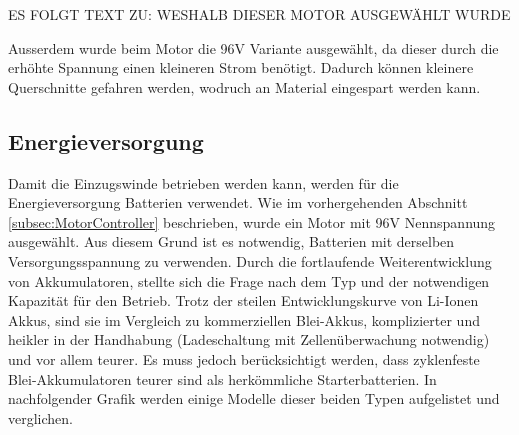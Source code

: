 ES FOLGT TEXT ZU: WESHALB DIESER MOTOR AUSGEWÄHLT WURDE


Ausserdem wurde beim Motor die 96V Variante ausgewählt, da dieser durch die erhöhte Spannung einen kleineren Strom benötigt. Dadurch können kleinere Querschnitte gefahren werden, wodruch an Material eingespart werden kann.

\subsection{Energieversorgung}\label{subsec:Energieversorgung}

Damit die Einzugswinde betrieben werden kann, werden für die Energieversorgung Batterien verwendet. Wie im vorhergehenden Abschnitt \ref{subsec:MotorController} beschrieben, wurde ein Motor mit 96V Nennspannung ausgewählt. Aus diesem Grund ist es notwendig, Batterien mit derselben Versorgungsspannung zu verwenden. Durch die fortlaufende Weiterentwicklung von Akkumulatoren, stellte sich die Frage nach dem Typ und der notwendigen Kapazität für den Betrieb. Trotz der steilen Entwicklungskurve von Li-Ionen Akkus, sind sie im Vergleich zu kommerziellen Blei-Akkus, komplizierter und heikler in der Handhabung (Ladeschaltung mit Zellenüberwachung notwendig) und vor allem teurer. Es muss jedoch berücksichtigt werden, dass zyklenfeste Blei-Akkumulatoren teurer sind als herkömmliche Starterbatterien.
In nachfolgender Grafik werden einige Modelle dieser beiden Typen aufgelistet und verglichen. 
